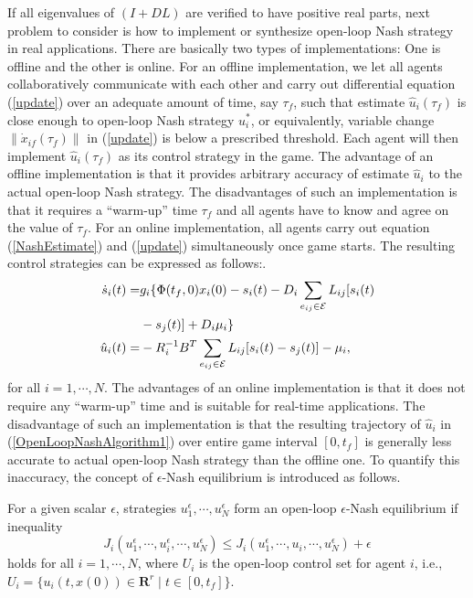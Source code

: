\documentclass[10pt,doublecolumn]{IEEEtran}  %
\begin{document}
If all eigenvalues of $(I+DL)$ are verified to have positive real parts, next problem to consider is how to implement or synthesize open-loop Nash strategy in real applications. There are basically two types of implementations: One is offline and the other is online. For an offline implementation, we let all agents collaboratively communicate with each other and carry out differential equation (\ref{update}) over an adequate amount of time, say $\tau_f$, such that estimate $\hat{u}_i(\tau_f)$ is close enough to open-loop Nash strategy $u_i^*$, or equivalently, variable change $\|\dot{x}_{if}(\tau_f)\|$ in (\ref{update}) is below a prescribed threshold. Each agent will then implement $\hat{u}_i(\tau_f)$ as its control strategy in the game. The advantage of an offline implementation is that it provides arbitrary accuracy of estimate $\hat{u}_i$ to the actual open-loop Nash strategy. The disadvantages of such an implementation is that it requires a ``warm-up'' time $\tau_f$ and all agents have to know and agree on the value of $\tau_f$. For an online implementation, all agents carry out equation (\ref{NashEstimate}) and (\ref{update}) simultaneously once game starts. The resulting control strategies can be expressed as follows:.
\begin{subequations}\label{OpenLoopNashAlgorithm}
\begin{align}
\dot{s}_i(t)=&g_i\{\Phi(t_f,0)x_i(0)-s_i(t)-D_i\sum_{e_{ij}\in\mathcal{E}}L_{ij}[s_i(t)\notag\\
 &-s_j(t)]+D_i\mu_i\} \label{OpenLoopNashAlgorithm2}\\
\hat{u}_i(t) =&-R_i^{-1}B^T\sum_{e_{ij}\in\mathcal{E}}L_{ij}[s_{i}(t)-s_{j}(t)]-\mu_i,\label{OpenLoopNashAlgorithm1}
\end{align}
\end{subequations}
for all $i=1,\cdots,N$. The advantages of an online implementation is that it does not require any ``warm-up'' time and is suitable for real-time applications. The disadvantage of such an implementation is that the resulting trajectory of $\hat{u}_i$ in (\ref{OpenLoopNashAlgorithm1}) over entire game interval $[0,t_f]$ is generally less accurate to actual open-loop Nash strategy than the offline one. To quantify this inaccuracy, the concept of $\epsilon$-Nash equilibrium is introduced as follows. 
\begin{Def}
For a given scalar $\epsilon$, strategies $u^{\epsilon}_{1},\cdots,u^{\epsilon}_N$ form an open-loop $\epsilon$-Nash equilibrium if inequality
\begin{equation}
J_{i}(u_1^{\epsilon},\cdots,u^{\epsilon}_i,\cdots,u^{\epsilon}_N)\leq J_{i}(u_1^{\epsilon},\cdots,u_i,\cdots,u^{\epsilon}_N)+\epsilon\label{epsilon1Nashinequality}
\end{equation}
holds for all $i=1,\cdots,N$, where $U_i$ is the open-loop control set for agent $i$, i.e., $U_i=\{u_i(t,x(0))\in \mathbf{R}^r \mid t\in[0,t_f]\}$.
\end{Def}
\end{document}
